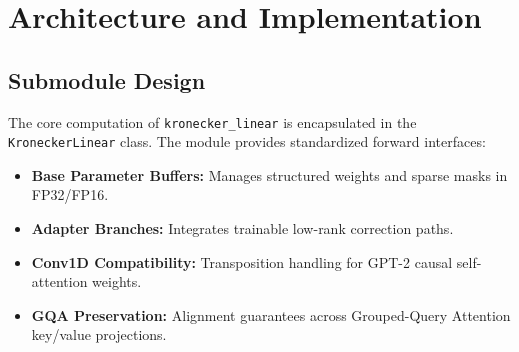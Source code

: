 \section{Architecture and Implementation}

\subsection{Submodule Design}
The core computation of \texttt{kronecker_linear} is encapsulated in the \texttt{KroneckerLinear} class. The module provides standardized forward interfaces:
\begin{itemize}
\item \textbf{Base Parameter Buffers:} Manages structured weights and sparse masks in FP32/FP16.
\item \textbf{Adapter Branches:} Integrates trainable low-rank correction paths.
\item \textbf{Conv1D Compatibility:} Transposition handling for GPT-2 causal self-attention weights.
\item \textbf{GQA Preservation:} Alignment guarantees across Grouped-Query Attention key/value projections.
\end{itemize}

